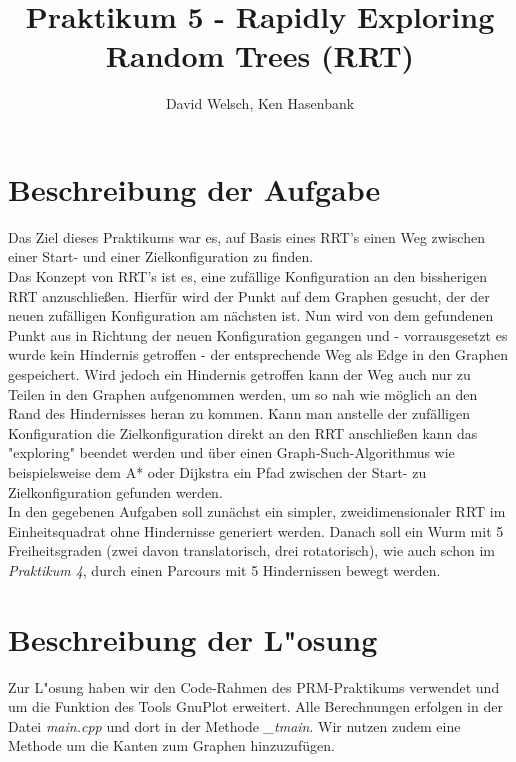 \documentclass[a4paper]{scrartcl}
\begin{document}
\titlehead{Wintersemester 2017/2018\\Motion Planning\\Prof. Horsch, Rudi Scheitler}
\author{David Welsch, Ken Hasenbank}
\title{Praktikum 5 - Rapidly Exploring Random Trees (RRT)}
\maketitle

\section*{Beschreibung der Aufgabe}

Das Ziel dieses Praktikums war es, auf Basis eines RRT's einen Weg zwischen einer Start- und einer Zielkonfiguration zu finden. \\

Das Konzept von RRT's ist es, eine zufällige Konfiguration an den bissherigen RRT anzuschließen. Hierfür wird der Punkt auf dem Graphen gesucht, der der neuen zufälligen Konfiguration am nächsten ist. Nun wird von dem gefundenen Punkt aus in Richtung der neuen Konfiguration gegangen und - vorrausgesetzt es wurde kein Hindernis getroffen - der entsprechende Weg als Edge in den Graphen gespeichert. Wird jedoch ein Hindernis getroffen kann der Weg auch nur zu Teilen in den Graphen aufgenommen werden, um so nah wie möglich an den Rand des Hindernisses heran zu kommen. Kann man anstelle der zufälligen Konfiguration die Zielkonfiguration direkt an den RRT anschließen kann das "exploring" beendet werden und über einen Graph-Such-Algorithmus wie beispielsweise dem A* oder Dijkstra ein Pfad zwischen der Start- zu Zielkonfiguration gefunden werden.\\

In den gegebenen Aufgaben soll zunächst ein simpler, zweidimensionaler RRT im Einheitsquadrat ohne Hindernisse generiert werden. Danach soll ein Wurm mit 5 Freiheitsgraden (zwei davon translatorisch, drei rotatorisch), wie auch schon im \textit{Praktikum 4}, durch einen Parcours mit 5 Hindernissen bewegt werden.

\section*{Beschreibung der L"osung}

Zur L"osung haben wir den Code-Rahmen des PRM-Praktikums verwendet und um die Funktion des Tools GnuPlot erweitert. Alle Berechnungen erfolgen in der Datei \textit{main.cpp} und dort in der Methode \textit{\_tmain}. Wir nutzen zudem eine Methode um die Kanten zum Graphen hinzuzufügen.\\
\end{document}
